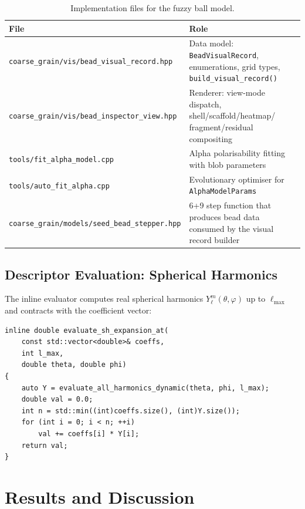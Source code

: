 \documentclass[12pt, a4paper, oneside]{article}
\newcommand{\file}[1]{\texttt{#1}}
\newcommand{\type}[1]{\texttt{#1}}
\newcommand{\SH}{Y_\ell^m}
\begin{document}
\begin{table}[htbp]
  \centering
  \caption{Implementation files for the fuzzy ball model.}
  \label{tab:files}
  \begin{tabular}{lp{8cm}}
    \toprule
    File & Role \\
    \midrule
    \file{coarse\_grain/vis/bead\_visual\_record.hpp}
      & Data model: \type{BeadVisualRecord}, enumerations,
        grid types, \texttt{build\_visual\_record()} \\
    \file{coarse\_grain/vis/bead\_inspector\_view.hpp}
      & Renderer: view-mode dispatch, shell/scaffold/heatmap/
        fragment/residual compositing \\
    \file{tools/fit\_alpha\_model.cpp}
      & Alpha polarisability fitting with blob parameters \\
    \file{tools/auto\_fit\_alpha.cpp}
      & Evolutionary optimiser for \type{AlphaModelParams} \\
    \file{coarse\_grain/models/seed\_bead\_stepper.hpp}
      & 6+9 step function that produces bead data consumed by
        the visual record builder \\
    \bottomrule
  \end{tabular}
\end{table}

\subsection{Descriptor Evaluation: Spherical Harmonics}

The inline evaluator computes real spherical harmonics $\SH(\theta,\varphi)$
up to $\ell_{\max}$ and contracts with the coefficient vector:

\begin{lstlisting}
inline double evaluate_sh_expansion_at(
    const std::vector<double>& coeffs,
    int l_max,
    double theta, double phi)
{
    auto Y = evaluate_all_harmonics_dynamic(theta, phi, l_max);
    double val = 0.0;
    int n = std::min((int)coeffs.size(), (int)Y.size());
    for (int i = 0; i < n; ++i)
        val += coeffs[i] * Y[i];
    return val;
}
\end{lstlisting}

\section{Results and Discussion}
\end{document}
